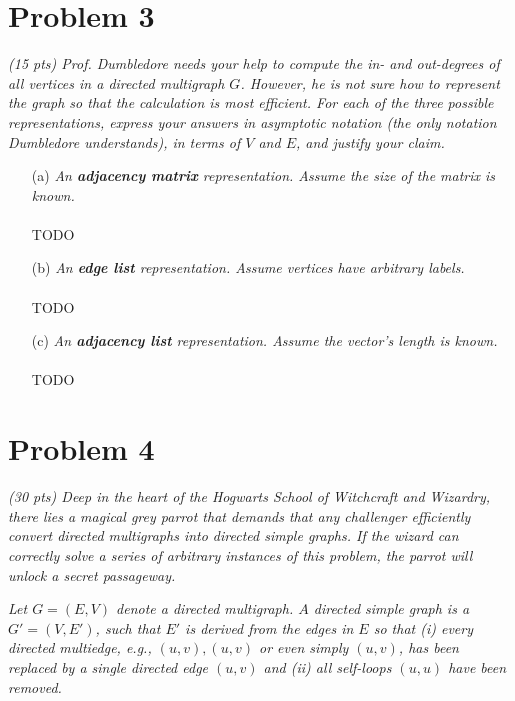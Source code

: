 \documentclass[12pt]{article} \setlength{\oddsidemargin}{0in}
\begin{document}
\newpage

\section*{Problem 3}

\textit{(15 pts) Prof. Dumbledore needs your help to compute the in-
  and out-degrees of all vertices in a directed multigraph
  $G$. However, he is not sure how to represent the graph so that the
  calculation is most efficient. For each of the three possible
  representations, express your answers in asymptotic notation (the
  only notation Dumbledore understands), in terms of $V$ and $E$, and
  justify your claim.}

\begin{enumerate}
\item[(a)]{\textit{An \textbf{adjacency matrix} representation. Assume
      the size of the matrix is known.}}
  \\\\
  TODO
  \\
\item[(b)]{\textit{An \textbf{edge list} representation. Assume
      vertices have arbitrary labels.}}
  \\\\
  TODO
  \\
\item[(c)]{\textit{An \textbf{adjacency list} representation. Assume
      the vector’s length is known.}}
  \\\\
  TODO

\end{enumerate}

\newpage
\section*{Problem 4}

\textit{(30 pts) Deep in the heart of the Hogwarts School of
  Witchcraft and Wizardry, there lies a magical grey parrot that
  demands that any challenger efficiently convert directed multigraphs
  into directed simple graphs. If the wizard can correctly solve a
  series of arbitrary instances of this problem, the parrot will
  unlock a secret passageway.}

\textit{Let $G = (E, V)$ denote a directed multigraph. $A$ directed
  simple graph is a $G' = (V, E')$, such that $E'$ is derived from the
  edges in $E$ so that (i) every directed multiedge, e.g.,
  ${(u, v), (u, v)}$ or even simply ${(u, v)}$, has been replaced by a
  single directed edge ${(u, v)}$ and (ii) all self-loops $(u, u)$
  have been removed.}
\end{document}
